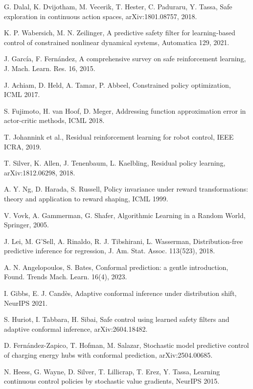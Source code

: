 \documentclass[11pt]{article}
\begin{document}
\begin{list}{}{\setlength{\leftmargin}{2.4em}\setlength{\labelwidth}{2.4em}\setlength{\itemsep}{2pt}\setlength{\parsep}{0pt}}
\item[\textbf{[12]}] G. Dalal, K. Dvijotham, M. Vecerik, T. Hester, C. Paduraru, Y. Tassa, Safe exploration in continuous action spaces, arXiv:1801.08757, 2018.
\item[\textbf{[13]}] K. P. Wabersich, M. N. Zeilinger, A predictive safety filter for learning-based control of constrained nonlinear dynamical systems, Automatica 129, 2021.
\item[\textbf{[14]}] J. Garc\'ia, F. Fern\'andez, A comprehensive survey on safe reinforcement learning, J. Mach. Learn. Res. 16, 2015.
\item[\textbf{[15]}] J. Achiam, D. Held, A. Tamar, P. Abbeel, Constrained policy optimization, ICML 2017.
\item[\textbf{[16]}] S. Fujimoto, H. van Hoof, D. Meger, Addressing function approximation error in actor-critic methods, ICML 2018.
\item[\textbf{[17]}] T. Johannink et al., Residual reinforcement learning for robot control, IEEE ICRA, 2019.
\item[\textbf{[18]}] T. Silver, K. Allen, J. Tenenbaum, L. Kaelbling, Residual policy learning, arXiv:1812.06298, 2018.
\item[\textbf{[19]}] A. Y. Ng, D. Harada, S. Russell, Policy invariance under reward transformations: theory and application to reward shaping, ICML 1999.
\item[\textbf{[20]}] V. Vovk, A. Gammerman, G. Shafer, Algorithmic Learning in a Random World, Springer, 2005.
\item[\textbf{[21]}] J. Lei, M. G'Sell, A. Rinaldo, R. J. Tibshirani, L. Wasserman, Distribution-free predictive inference for regression, J. Am. Stat. Assoc. 113(523), 2018.
\item[\textbf{[22]}] A. N. Angelopoulos, S. Bates, Conformal prediction: a gentle introduction, Found. Trends Mach. Learn. 16(4), 2023.
\item[\textbf{[23]}] I. Gibbs, E. J. Cand\`es, Adaptive conformal inference under distribution shift, NeurIPS 2021.
\item[\textbf{[24]}] S. Huriot, I. Tabbara, H. Sibai, Safe control using learned safety filters and adaptive conformal inference, arXiv:2604.18482.
\item[\textbf{[25]}] D. Fern\'andez-Zapico, T. Hofman, M. Salazar, Stochastic model predictive control of charging energy hubs with conformal prediction, arXiv:2504.00685.
\item[\textbf{[26]}] N. Heess, G. Wayne, D. Silver, T. Lillicrap, T. Erez, Y. Tassa, Learning continuous control policies by stochastic value gradients, NeurIPS 2015.

\end{list}
\end{document}
